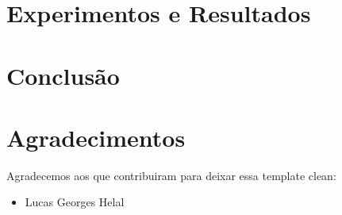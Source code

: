 \documentclass[conference]{IEEEtran}
\begin{document}



\section{Experimentos e Resultados}
\label{sec:ExperimentosResultados}




\section{Conclusão}
\label{sec:conclusão}




\section*{Agradecimentos}


Agradecemos aos que contribuiram para deixar essa template clean:

\begin{itemize}
  \item Lucas Georges Helal
\end{itemize}



\begin{thebibliography}{1}



\end{thebibliography}




\end{document}
